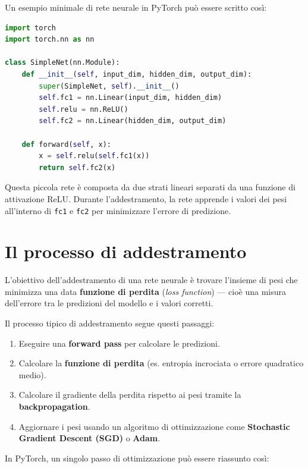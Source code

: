 \documentclass[11pt,a4paper]{report}
\begin{document}
Un esempio minimale di rete neurale in PyTorch può essere scritto così:

\begin{lstlisting}[language=Python, caption={Esempio di rete neurale feed-forward in PyTorch.}]
import torch
import torch.nn as nn

class SimpleNet(nn.Module):
    def __init__(self, input_dim, hidden_dim, output_dim):
        super(SimpleNet, self).__init__()
        self.fc1 = nn.Linear(input_dim, hidden_dim)
        self.relu = nn.ReLU()
        self.fc2 = nn.Linear(hidden_dim, output_dim)

    def forward(self, x):
        x = self.relu(self.fc1(x))
        return self.fc2(x)
\end{lstlisting}

\begin{tcolorbox}[title=Spiegazione]
Questa piccola rete è composta da due strati lineari separati da una funzione di attivazione ReLU.  
Durante l’addestramento, la rete apprende i valori dei pesi all’interno di \texttt{fc1} e \texttt{fc2} per minimizzare l’errore di predizione.
\end{tcolorbox}

\section{Il processo di addestramento}

L’obiettivo dell’addestramento di una rete neurale è trovare l’insieme di pesi che minimizza una data \textbf{funzione di perdita} (\emph{loss function}) — cioè una misura dell’errore tra le predizioni del modello e i valori corretti.

Il processo tipico di addestramento segue questi passaggi:
\begin{enumerate}
  \item Eseguire una \textbf{forward pass} per calcolare le predizioni.
  \item Calcolare la \textbf{funzione di perdita} (es. entropia incrociata o errore quadratico medio).
  \item Calcolare il gradiente della perdita rispetto ai pesi tramite la \textbf{backpropagation}.
  \item Aggiornare i pesi usando un algoritmo di ottimizzazione come \textbf{Stochastic Gradient Descent (SGD)} o \textbf{Adam}.
\end{enumerate}

In PyTorch, un singolo passo di ottimizzazione può essere riassunto così:
\end{document}

